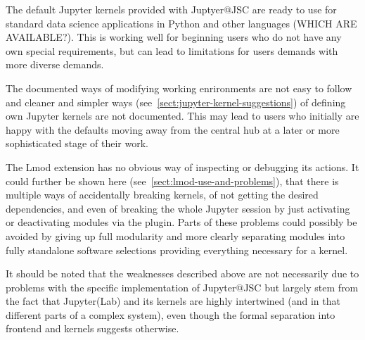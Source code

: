 The default Jupyter kernels provided with Juptyer@JSC are ready to use for standard data science applications in Python and other languages (WHICH ARE AVAILABLE?).
This is working well for beginning users who do not have any own special requirements, but can lead to limitations for users demands with more diverse demands.

The documented ways of modifying working enrironments are not easy to follow and cleaner and simpler ways (see~\ref{sect:jupyter-kernel-suggestions}) of defining own Jupyter kernels are not documented.
This may lead to users who initially are happy with the defaults moving away from the central hub at a later or more sophisticated stage of their work.

The Lmod extension has no obvious way of inspecting or debugging its actions.
It could further be shown here (see~\ref{sect:lmod-use-and-problems}), that there is multiple ways of accidentally breaking kernels, of not getting the desired dependencies, and even of breaking the whole Jupyter session by just activating or deactivating modules via the plugin.
Parts of these problems could possibly be avoided by giving up full modularity and more clearly separating modules into fully standalone software selections providing everything necessary for a kernel.

It should be noted that the weaknesses described above are not necessarily due to problems with the specific implementation of Jupyter@JSC but largely stem from the fact that Jupyter(Lab) and its kernels are highly intertwined (and in that different parts of a complex system), even though the formal separation into frontend and kernels suggests otherwise.


